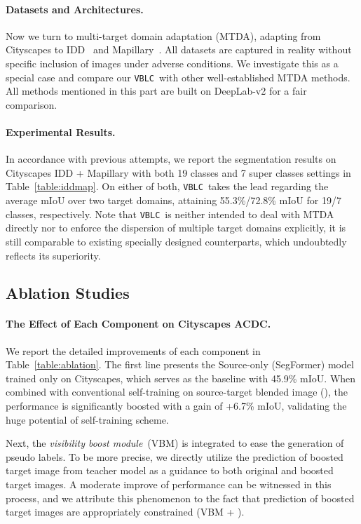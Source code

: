 \documentclass[letterpaper]{article} \usepackage{aaai23}  \usepackage{times}  \usepackage{helvet}  \usepackage{courier}  \usepackage[hyphens]{url}  \usepackage{graphicx} \urlstyle{rm} \def\UrlFont{\rm}  \usepackage{natbib}  \usepackage{caption} \frenchspacing  \setlength{\pdfpagewidth}{8.5in}  \setlength{\pdfpageheight}{11in}  \usepackage{algorithm}
\newcommand{\method}{\texttt{VBLC}~}
\newcommand{\boostModuleName}{\textit{visibility boost module}}
\begin{document}
\paragraph{Datasets and Architectures.} Now we turn to multi-target domain adaptation (MTDA), adapting from Cityscapes to IDD~\cite{varma2019idd} and Mapillary~\cite{neuhold2017mapillary}. All datasets are captured in reality without specific inclusion of images under adverse conditions. We investigate this as a special case and compare our \method with other well-established MTDA methods. All methods mentioned in this part are built on DeepLab-v2 for a fair comparison. 

\paragraph{Experimental Results.} In accordance with previous attempts, we report the segmentation results on Cityscapes  IDD + Mapillary with both 19 classes and 7 super classes settings  in Table~\ref{table:iddmap}. On either of both, \method takes the lead regarding the average mIoU over two target domains, attaining 55.3\%/72.8\% mIoU for 19/7 classes, respectively. 
Note that \method is neither intended to deal with MTDA directly nor to enforce the dispersion of multiple target domains explicitly, it is still comparable to existing specially designed counterparts, which undoubtedly reflects its superiority.

\subsection{Ablation Studies}
\label{sec:ablation}

\paragraph{The Effect of Each Component on Cityscapes  ACDC.} We report the detailed improvements of each component in Table~\ref{table:ablation}. The first line presents the Source-only (SegFormer) model trained only on Cityscapes, which serves as the baseline with 45.9\% mIoU. When combined with conventional self-training on source-target blended image (), the performance is significantly boosted with a gain of +6.7\% mIoU, validating the huge potential of self-training scheme. 

Next, the \boostModuleName~(VBM) is integrated to ease the generation of pseudo labels. To be more precise, we directly utilize the prediction of boosted target image from teacher model as a guidance to both original and boosted target images. A moderate improve of performance can be witnessed in this process, and we attribute this phenomenon to the fact that prediction of boosted target images are appropriately constrained (VBM + ). 
\end{document}
